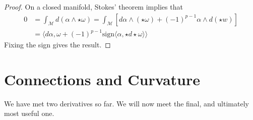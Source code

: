 \begin{proof}
  On a closed manifold, Stokes' theorem implies that
  \begin{align}
    0 &= \int_{\mathcal{M}} d(\alpha \wedge \star\omega) = \int_{\mathcal{M}} \left[ d\alpha \wedge (\star \omega) + (-1)^{p-1} \alpha \wedge d(\star w) \right]   \\
      &= \langle d\alpha, \omega + (-1)^{p-1} \text{sign} \langle \alpha, \star d\star\omega \rangle \rangle
  \end{align}
  Fixing the sign gives the result.
\end{proof}

\section{Connections and Curvature}%
\label{sec:connections_and_curvature}

We have met two derivatives so far. We will now meet the final, and ultimately most useful one.

